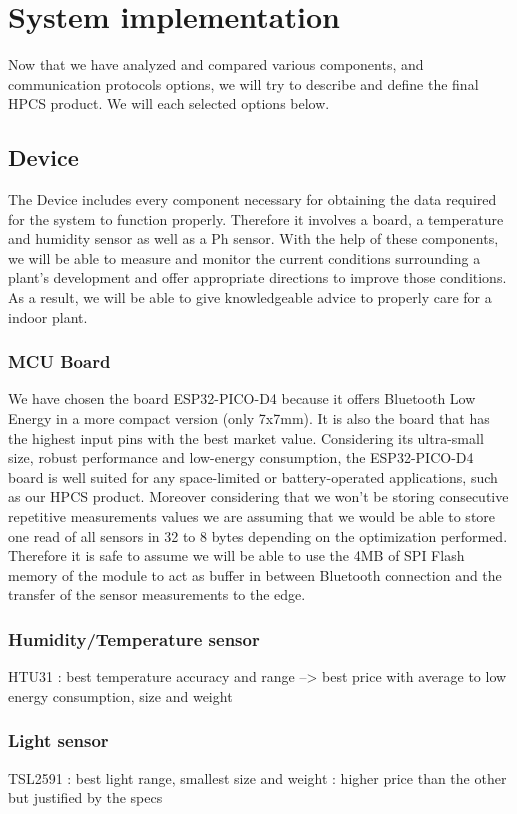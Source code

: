 \section{System implementation}
Now that we have analyzed and compared various components, and communication protocols options, we will try to describe and define the final HPCS product. We will each selected options below.
\subsection{Device}
The Device includes every component necessary for obtaining the data required for the system to function properly.
Therefore it involves a board, a temperature and humidity sensor as well as a Ph sensor. With the help of these components, we will be able to measure and monitor the current conditions surrounding a plant's development and offer appropriate directions to improve those conditions. As a result, we will be able to give knowledgeable advice to properly care for a indoor plant.
\subsubsection{MCU Board}
We have chosen the board ESP32-PICO-D4 because it offers Bluetooth Low Energy in a more compact version (only 7x7mm). It is also the board that has the highest input pins with the best market value.
Considering its ultra-small size, robust performance and low-energy consumption, the ESP32-PICO-D4 board is well suited for any space-limited or battery-operated applications, such as our HPCS product.
Moreover considering that we won't be storing consecutive repetitive measurements values we are assuming that we would be able to store one read of all sensors in 32 to 8 bytes depending on the optimization performed. Therefore it is safe to assume we will be able to use the 4MB of SPI Flash memory of the module to act as buffer in between Bluetooth connection and the transfer of the sensor measurements to the edge.

\subsubsection{Humidity/Temperature sensor}
HTU31 : best temperature accuracy and range --> best price with average to low energy consumption, size and weight 
\subsubsection{Light sensor}
TSL2591 : best light range, smallest size and weight : higher price than the other but justified by the specs

